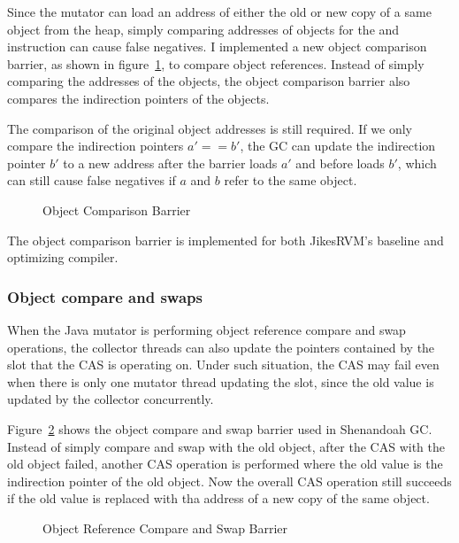Since the mutator can load an address of either the old or new copy of a same object
from the heap, simply comparing addresses of objects for the  and 
instruction can cause false negatives. I implemented a new object comparison barrier,
as shown in figure~\ref{fig:objectcomparisonbarrier}, to compare object references.
Instead of simply comparing the addresses of the objects, the object comparison barrier also
compares the indirection pointers of the objects.

The comparison of the original object addresses is still required. If we only compare the
indirection pointers $a' == b'$, the GC can update the indirection pointer $b'$ to a new
address after the barrier loads $a'$ and before loads $b'$, which can still cause false
negatives if $a$ and $b$ refer to the same object.

\begin{figure}
  \centering
  
  \caption{Object Comparison Barrier}
  \label{fig:objectcomparisonbarrier}
\end{figure}

The object comparison barrier is implemented for both JikesRVM's baseline and optimizing compiler.

\subsubsection{Object compare and swaps}

When the Java mutator is performing object reference compare and swap operations,
the collector threads can also update the pointers contained by the slot that the CAS
is operating on. Under such situation, the CAS may fail even when there is only one mutator
thread updating the slot, since the old value is updated by the collector concurrently.

Figure~\ref{fig:objectcasbarrier} shows the object compare and swap barrier used in Shenandoah GC.
Instead of simply compare and swap with the old object, after the CAS with the old object failed,
another CAS operation is performed where the old value is the indirection pointer of the old object.
Now the overall CAS operation still succeeds if the old value is replaced with
tha address of a new copy of the same object.

\begin{figure}
  \centering
  
  \caption{Object Reference Compare and Swap Barrier} 
  \label{fig:objectcasbarrier}
\end{figure}

